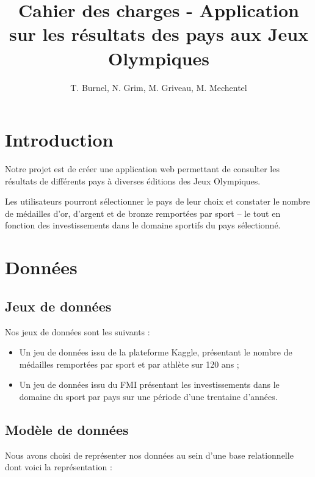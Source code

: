 \documentclass[12pt]{article}
\title{Cahier des charges - Application sur les résultats des pays aux Jeux Olympiques}
\date{}
\author{T. Burnel, N. Grim, M. Griveau, M. Mechentel}
\begin{document}
	\maketitle
	\tableofcontents
	
	\section{Introduction}
	
	Notre projet est de créer une application web permettant de consulter les résultats de différents pays à diverses éditions des Jeux Olympiques.
	
	Les utilisateurs pourront sélectionner le pays de leur choix et constater le nombre de médailles d'or, d'argent et de bronze remportées par sport -- le tout en fonction des investissements dans le domaine sportifs du pays sélectionné.
	
	\section{Données}
	
	\subsection{Jeux de données}
	
	Nos jeux de données sont les suivants :
	
	\begin{itemize}
		\item Un jeu de données issu de la plateforme Kaggle, présentant le nombre de médailles remportées par sport et par athlète sur 120 ans ;
		\item Un jeu de données issu du FMI présentant les investissements dans le domaine du sport par pays sur une période d’une trentaine d’années.
	\end{itemize}

	\subsection{Modèle de données}
	
	Nous avons choisi de représenter nos données au sein d'une base relationnelle dont voici la représentation :
	
\end{document}
